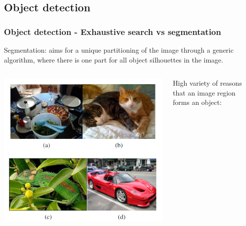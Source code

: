 \subsection{Object detection}

\begin{frame}[allowframebreaks]
	\frametitle{Object detection - Exhaustive search vs segmentation}
	
	Segmentation: aims for
	a unique partitioning of the image through a generic algorithm,
	where there is one part for all object silhouettes in the image.
	
	\medskip 
	
\begin{columns} %
		
		\begin{column}{.5\textwidth}
			\begin{center}
				\includegraphics[scale=0.6]{figs/selectivesearch_pictures}
			\end{center}
		\end{column}%
		

		
		\begin{column}{.4\textwidth}
		High variety of reasons that an image region forms an object: 
		
		
		
		\end{column}%
	\end{columns}
	

\end{frame}
